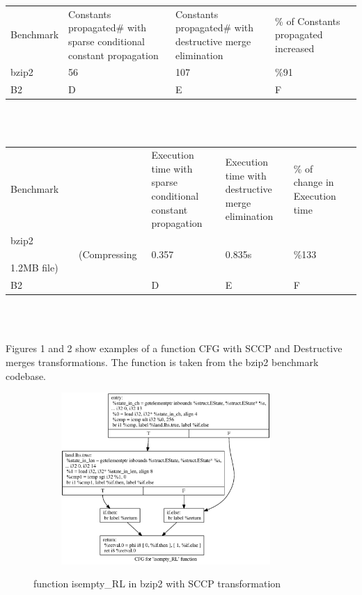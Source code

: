 \documentclass{article}
\begin{document}
\begin{adjustbox}{center}
\renewcommand{\arraystretch}{2}
\begin{tabular}{| C{3cm} | C{3cm} | C{3cm} | C{3cm} | C{3cm} |}
\hline
Benchmark & Constants propagated\# with sparse conditional constant propagation & Constants propagated\# with destructive merge elimination & \% of Constants propagated increased \\  
bzip2 & 56 & 107 & \%91  \\ 
B2 & D & E & F  \\ 

\end{tabular}
\end{adjustbox}

~\\~
\begin{adjustbox}{center}
\renewcommand{\arraystretch}{2}
\begin{tabular}{| C{4cm} | C{3cm} | C{3cm} | C{3cm} | C{3cm} |}
\hline
Benchmark & Execution time with sparse conditional constant propagation & Execution time with destructive merge elimination & \% of change in Execution time \\  
bzip2 ~~~~~~~~~~~~~~(Compressing 1.2MB file) & 0.357 & 0.835s & \%133  \\ 
B2 & D & E & F  \\ 
\end{tabular}
\end{adjustbox}

~\\~

Figures 1 and 2 show examples of a function CFG with SCCP and Destructive merges transformations. The function is taken from the bzip2 benchmark codebase. 

\begin{figure}[H]
\begin{subfigure}{1\textwidth}
  \centering
\includegraphics[width=300px]{bzip2-example-sccp} 
\end{subfigure}
\caption{function isempty\_RL in bzip2 with SCCP transformation}
\label{fig:test}
\end{figure}
\end{document}
